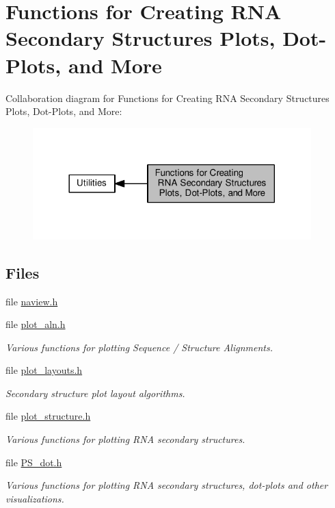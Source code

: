 \hypertarget{group__plotting__utils}{}\section{Functions for Creating R\+NA Secondary Structures Plots, Dot-\/\+Plots, and More}
\label{group__plotting__utils}
Collaboration diagram for Functions for Creating R\+NA Secondary Structures Plots, Dot-\/\+Plots, and More\+:
\nopagebreak
\begin{figure}[H]
\begin{center}
\leavevmode
\includegraphics[width=305pt]{group__plotting__utils}
\end{center}
\end{figure}
\subsection*{Files}
\begin{DoxyCompactItemize}
\item 
file \hyperlink{naview_8h}{naview.\+h}
\item 
file \hyperlink{plot__aln_8h}{plot\+\_\+aln.\+h}
\begin{DoxyCompactList}\small\item\em Various functions for plotting Sequence / Structure Alignments. \end{DoxyCompactList}\item 
file \hyperlink{plot__layouts_8h}{plot\+\_\+layouts.\+h}
\begin{DoxyCompactList}\small\item\em Secondary structure plot layout algorithms. \end{DoxyCompactList}\item 
file \hyperlink{plot__structure_8h}{plot\+\_\+structure.\+h}
\begin{DoxyCompactList}\small\item\em Various functions for plotting R\+NA secondary structures. \end{DoxyCompactList}\item 
file \hyperlink{PS__dot_8h}{P\+S\+\_\+dot.\+h}
\begin{DoxyCompactList}\small\item\em Various functions for plotting R\+NA secondary structures, dot-\/plots and other visualizations. \end{DoxyCompactList}\end{DoxyCompactItemize}
